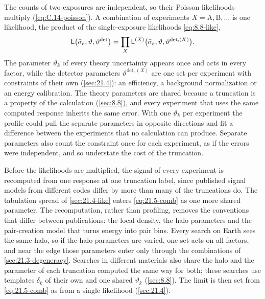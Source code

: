 The counts of two exposures are independent, so their Poisson likelihoods multiply (\cref{eq:C.14-poisson}). A combination of experiments $X = \mathrm{A}, \mathrm{B}, \dots$ is one likelihood, the product of the single-exposure likelihoods \cref{eq:8.8-like},
\begin{equation}
  \mathsf{L}\bigl(\bar{\sigma}_{e}, \vartheta, \vartheta^{\mathrm{det}}\bigr) = \prod_X\mathsf{L}^{(X)}\bigl(\bar{\sigma}_{e}, \vartheta, \vartheta^{\mathrm{det},(X)}\bigr) .
  \label{eq:21.5-comb}
\end{equation}
The parameter $\vartheta_k$ of every theory uncertainty appears once and acts in every factor, while the detector parameters $\vartheta^{\mathrm{det},(X)}$ are one set per experiment with constraints of their own (\cref{sec:21.4}): an efficiency, a background normalization or an energy calibration. The theory parameters are shared because a truncation is a property of the calculation (\cref{sec:8.8}), and every experiment that uses the same computed response inherits the same error. With one $\vartheta_k$ per experiment the profile could pull the separate parameters in opposite directions and fit a difference between the experiments that no calculation can produce. Separate parameters also count the constraint once for each experiment, as if the errors were independent, and so understate the cost of the truncation.

Before the likelihoods are multiplied, the signal of every experiment is recomputed from one response at one truncation label, since published signal models from different codes differ by more than many of the truncations do. The tabulation spread of \cref{sec:21.4-like} enters \cref{eq:21.5-comb} as one more shared parameter. The recomputation, rather than profiling, removes the conventions that differ between publications: the local density, the halo parameters and the pair-creation model that turns energy into pair bins. Every search on Earth sees the same halo, so if the halo parameters are varied, one set acts on all factors, and near the edge those parameters enter only through the combinations of \cref{sec:21.3-degeneracy}. Searches in different materials also share the halo and the parameter of each truncation computed the same way for both; these searches use templates $\delta_k$ of their own and one shared $\vartheta_k$ (\cref{sec:8.8}). The limit is then set from \cref{eq:21.5-comb} as from a single likelihood (\cref{sec:21.4}).

